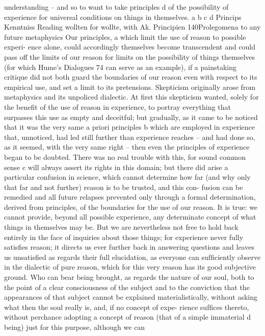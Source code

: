 understanding – and so to want to take principles d of the possibility of
experience for universal conditions on things in themselves.
a
b
c
d
Princips
Kenntniss
Reading wollten for wollte, with Ak.
Principien
140Prolegomena to any future metaphysics
Our principles, a which limit the use of reason to possible experi-
ence alone, could accordingly themselves become transcendent and could
pass off the limits of our reason for limits on the possibility of things
themselves (for which Hume’s Dialogues 74 can serve as an example), if
a painstaking critique did not both guard the boundaries of our reason
even with respect to its empirical use, and set a limit to its pretensions.
Skepticism originally arose from metaphysics and its unpoliced dialectic.
At ﬁrst this skepticism wanted, solely for the beneﬁt of the use of reason
in experience, to portray everything that surpasses this use as empty and
deceitful; but gradually, as it came to be noticed that it was the very same a
priori principles b which are employed in experience that, unnoticed, had
led still further than experience reaches – and had done so, as it seemed,
with the very same right – then even the principles of experience began
to be doubted. There was no real trouble with this, for sound common
sense c will always assert its rights in this domain; but there did arise a
particular confusion in science, which cannot determine how far (and
why only that far and not further) reason is to be trusted, and this con-
fusion can be remedied and all future relapses prevented only through
a formal determination, derived from principles, of the boundaries for
the use of our reason.
It is true: we cannot provide, beyond all possible experience, any
determinate concept of what things in themselves may be. But we are
nevertheless not free to hold back entirely in the face of inquiries about
those things; for experience never fully satisﬁes reason; it directs us ever
further back in answering questions and leaves us unsatisﬁed as regards
their full elucidation, as everyone can sufﬁciently observe in the dialectic
of pure reason, which for this very reason has its good subjective ground.
Who can bear being brought, as regards the nature of our soul, both to
the point of a clear consciousness of the subject and to the conviction
that the appearances of that subject cannot be explained materialistically,
without asking what then the soul really is, and, if no concept of expe-
rience sufﬁces thereto, without perchance adopting a concept of reason
(that of a simple immaterial d being) just for this purpose, although we can
